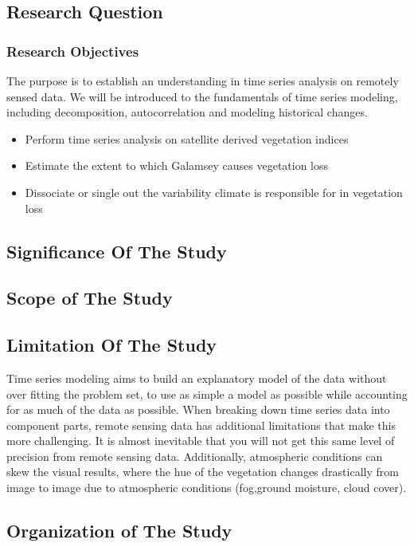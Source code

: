 \documentclass[10pt]{report}
\begin{document}
\begin{flushleft}
		  \subsection{Research  Question}
		  \subsubsection{Research Objectives}
		  The purpose is to establish an understanding in time series analysis on remotely sensed data. We will be introduced to the fundamentals of time series modeling, including decomposition, autocorrelation and modeling historical changes.
		  \begin{itemize}
		  	\item  Perform time series analysis on satellite derived vegetation indices
		  	
		  	\item  Estimate the extent to which Galamsey causes vegetation loss
		  	
		  	\item  Dissociate or single out the variability climate is responsible for in vegetation loss
		  \end{itemize}
		  \subsection{Significance Of The  Study}
		  \subsection{Scope of The  Study}
		  \subsection{Limitation Of  The Study }
		  Time series modeling aims to build an explanatory model of the data without over fitting the problem set, to use as simple a model as possible while accounting for as much of the data as possible. When breaking down time series data into component parts, remote sensing data has additional limitations that make this more challenging. It is almost inevitable that you will not get this same level of precision from remote sensing data. Additionally, atmospheric conditions can skew the visual results, where the hue of the vegetation changes drastically from image to image due to atmospheric conditions (fog,ground moisture, cloud cover).
		  \subsection{ Organization  of  The  Study}

\end{flushleft}
\end{document}
